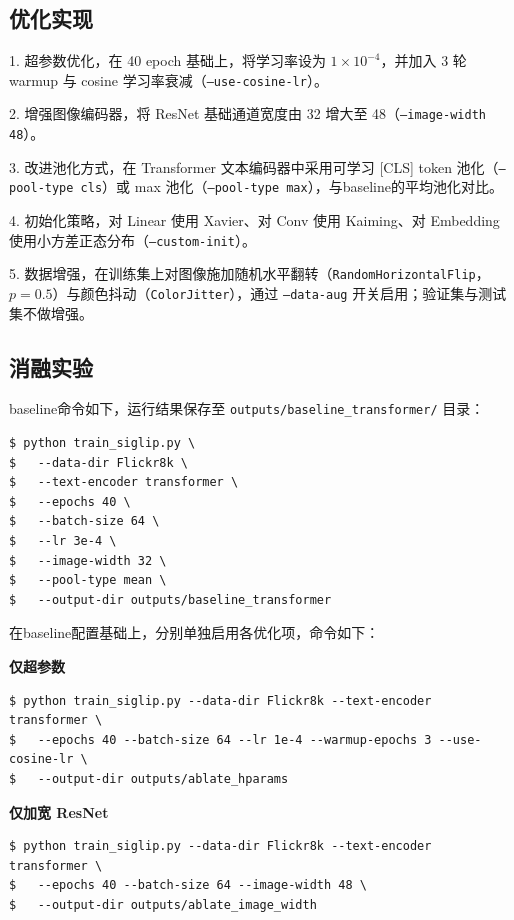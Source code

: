 \documentclass[a4paper]{article}
\begin{document}
\subsection{优化实现}

    1. 超参数优化，在 40 epoch 基础上，将学习率设为 $1\times 10^{-4}$，并加入 3 轮 warmup 与 cosine 学习率衰减（\texttt{--use-cosine-lr}）。

    2. 增强图像编码器，将 ResNet 基础通道宽度由 32 增大至 48（\texttt{--image-width 48}）。

    3. 改进池化方式，在 Transformer 文本编码器中采用可学习 [CLS] token 池化（\texttt{--pool-type cls}）或 max 池化（\texttt{--pool-type max}），与baseline的平均池化对比。

    4. 初始化策略，对 Linear 使用 Xavier、对 Conv 使用 Kaiming、对 Embedding 使用小方差正态分布（\texttt{--custom-init}）。

    5. 数据增强，在训练集上对图像施加随机水平翻转（\texttt{RandomHorizontalFlip}，$p=0.5$）与颜色抖动（\texttt{ColorJitter}），通过 \texttt{--data-aug} 开关启用；验证集与测试集不做增强。

\subsection{消融实验}

baseline命令如下，运行结果保存至 \texttt{outputs/baseline\_transformer/} 目录：

\begin{lstlisting}
$ python train_siglip.py \
$   --data-dir Flickr8k \
$   --text-encoder transformer \
$   --epochs 40 \
$   --batch-size 64 \
$   --lr 3e-4 \
$   --image-width 32 \
$   --pool-type mean \
$   --output-dir outputs/baseline_transformer
\end{lstlisting}

在baseline配置基础上，分别单独启用各优化项，命令如下：


\textbf{仅超参数}
\begin{lstlisting}
$ python train_siglip.py --data-dir Flickr8k --text-encoder transformer \
$   --epochs 40 --batch-size 64 --lr 1e-4 --warmup-epochs 3 --use-cosine-lr \
$   --output-dir outputs/ablate_hparams
\end{lstlisting}

\textbf{仅加宽 ResNet}

\begin{lstlisting}
$ python train_siglip.py --data-dir Flickr8k --text-encoder transformer \
$   --epochs 40 --batch-size 64 --image-width 48 \
$   --output-dir outputs/ablate_image_width
\end{lstlisting}
\end{document}
